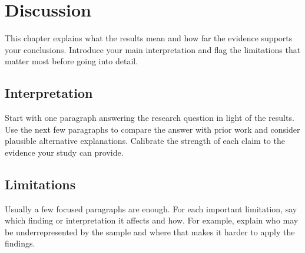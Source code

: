 \chapter{Discussion}
\label{chap:discussion}

This chapter explains what the results mean and how far the evidence supports your conclusions. Introduce your main interpretation and flag the limitations that matter most before going into detail.

\section{Interpretation}
Start with one paragraph answering the research question in light of the results. Use the next few paragraphs to compare the answer with prior work and consider plausible alternative explanations. Calibrate the strength of each claim to the evidence your study can provide.

\section{Limitations}
Usually a few focused paragraphs are enough. For each important limitation, say which finding or interpretation it affects and how. For example, explain who may be underrepresented by the sample and where that makes it harder to apply the findings.